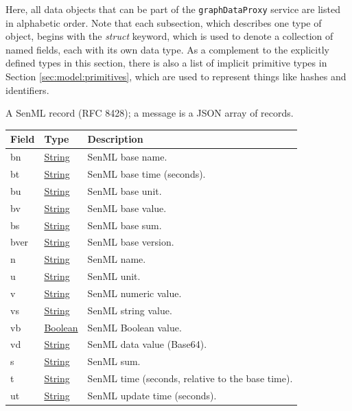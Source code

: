 \documentclass[a4paper]{arrowhead}
\newcommand{\pref}[1]{{\textcolor{ArrowheadGrey}{\hyperref[sec:model:primitives:#1]{#1}}}}
\begin{document}
Here, all data objects that can be part of the \texttt{graphDataProxy} service are listed in alphabetic order.
Note that each subsection, which describes one type of object, begins with the \textit{struct} keyword, which is used to denote a collection of named fields, each with its own data type.
As a complement to the explicitly defined types in this section, there is also a list of implicit primitive types in Section \ref{sec:model:primitives}, which are used to represent things like hashes and identifiers.


A SenML record (RFC 8428); a message is a JSON array of records.


\noindent\begin{tabularx}{\textwidth}{| >{\raggedright\arraybackslash}p{3.9cm} | >{\raggedright\arraybackslash\small}p{5.3cm} | X |} \hline
\rowcolor{gray!33} Field & Type & Description \\ \hline
bn & \pref{String} & SenML base name. \\ \hline
bt & \pref{String} & SenML base time (seconds). \\ \hline
bu & \pref{String} & SenML base unit. \\ \hline
bv & \pref{String} & SenML base value. \\ \hline
bs & \pref{String} & SenML base sum. \\ \hline
bver & \pref{String} & SenML base version. \\ \hline
n & \pref{String} & SenML name. \\ \hline
u & \pref{String} & SenML unit. \\ \hline
v & \pref{String} & SenML numeric value. \\ \hline
vs & \pref{String} & SenML string value. \\ \hline
vb & \pref{Boolean} & SenML Boolean value. \\ \hline
vd & \pref{String} & SenML data value (Base64). \\ \hline
s & \pref{String} & SenML sum. \\ \hline
t & \pref{String} & SenML time (seconds, relative to the base time). \\ \hline
ut & \pref{String} & SenML update time (seconds). \\ \hline
\end{tabularx}



\end{document}
